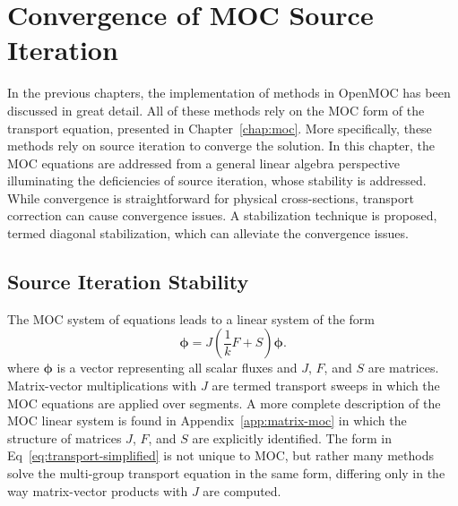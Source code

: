 \chapter{Convergence of MOC Source Iteration}
\label{chap:moc-convergence}

In the previous chapters, the implementation of methods in OpenMOC has been discussed in great detail. All of these methods rely on the \ac{MOC} form of the transport equation, presented in Chapter~\ref{chap:moc}. More specifically, these methods rely on source iteration to converge the solution. In this chapter, the \ac{MOC} equations are addressed from a general linear algebra perspective illuminating the deficiencies of source iteration, whose stability is addressed. While convergence is straightforward for physical cross-sections, transport correction can cause convergence issues. A stabilization technique is proposed, termed diagonal stabilization, which can alleviate the convergence issues.

\section{Source Iteration Stability}
\label{sec:source-iteration}

The \ac{MOC} system of equations leads to a linear system of the form
\begin{equation}
	\boldsymbol{\phi} = J \left(\frac{1}{k} F + S \right) \boldsymbol{\phi}.
	\label{eq:transport-simplified}
\end{equation}
where $\boldsymbol{\phi}$ is a vector representing all scalar fluxes and $J$, $F$, and $S$ are matrices. Matrix-vector multiplications with $J$ are termed transport sweeps in which the \ac{MOC} equations are applied over segments. A more complete description of the \ac{MOC} linear system is found in Appendix~\ref{app:matrix-moc} in which the structure of matrices $J$, $F$, and $S$ are explicitly identified. The form in Eq~\ref{eq:transport-simplified} is not unique to \ac{MOC}, but rather many methods solve the multi-group transport equation in the same form, differing only in the way matrix-vector products with $J$ are computed.

